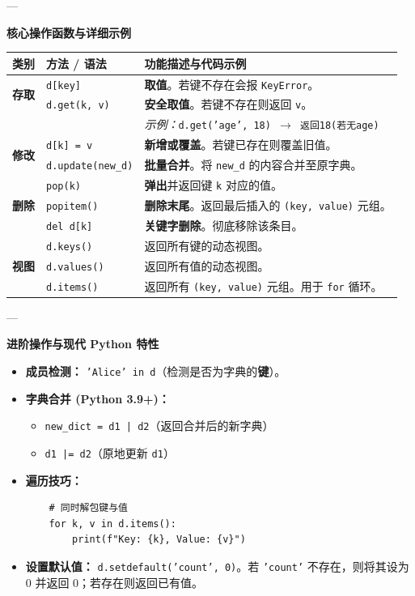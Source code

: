 \documentclass{article}
\begin{document}
---

\textbf{核心操作函数与详细示例}

\begin{table}[h]
\centering
\renewcommand{\arraystretch}{1.4}
\begin{tabular}{|l|l|p{8cm}|}
\hline
\textbf{类别} & \textbf{方法 / 语法} & \textbf{功能描述与代码示例} \\ \hline
\multirow{2}{*}{\textbf{存取}} & \texttt{d[key]} & \textbf{取值}。若键不存在会报 \texttt{KeyError}。\\ \cline{2-3} 
 & \texttt{d.get(k, v)} & \textbf{安全取值}。若键不存在则返回 \texttt{v}。\\ 
 & & \textit{示例：}\texttt{d.get('age', 18) $\rightarrow$ 返回18(若无age)} \\ \hline
\multirow{2}{*}{\textbf{修改}} & \texttt{d[k] = v} & \textbf{新增或覆盖}。若键已存在则覆盖旧值。 \\ \cline{2-3} 
 & \texttt{d.update(new\_d)} & \textbf{批量合并}。将 \texttt{new\_d} 的内容合并至原字典。 \\ \hline
\multirow{3}{*}{\textbf{删除}} & \texttt{pop(k)} & \textbf{弹出}并返回键 \texttt{k} 对应的值。 \\ \cline{2-3} 
 & \texttt{popitem()} & \textbf{删除末尾}。返回最后插入的 \texttt{(key, value)} 元组。 \\ \cline{2-3} 
 & \texttt{del d[k]} & \textbf{关键字删除}。彻底移除该条目。 \\ \hline
\multirow{3}{*}{\textbf{视图}} & \texttt{d.keys()} & 返回所有键的动态视图。 \\ \cline{2-3} 
 & \texttt{d.values()} & 返回所有值的动态视图。 \\ \cline{2-3} 
 & \texttt{d.items()} & 返回所有 \texttt{(key, value)} 元组。用于 \texttt{for} 循环。 \\ \hline
\end{tabular}
\end{table}

---

\textbf{进阶操作与现代 Python 特性}
\begin{itemize}
    \item \textbf{成员检测：} \texttt{'Alice' in d}（检测是否为字典的\textbf{键}）。
    \item \textbf{字典合并 (Python 3.9+)：} 
    \begin{itemize}
        \item \texttt{new\_dict = d1 | d2}（返回合并后的新字典）
        \item \texttt{d1 |= d2}（原地更新 \texttt{d1}）
    \end{itemize}
    \item \textbf{遍历技巧：}
    \begin{verbatim}
    # 同时解包键与值
    for k, v in d.items():
        print(f"Key: {k}, Value: {v}")
    \end{verbatim}
    \item \textbf{设置默认值：} \texttt{d.setdefault('count', 0)}。若 \texttt{'count'} 不存在，则将其设为 0 并返回 0；若存在则返回已有值。
\end{itemize}
\end{document}
